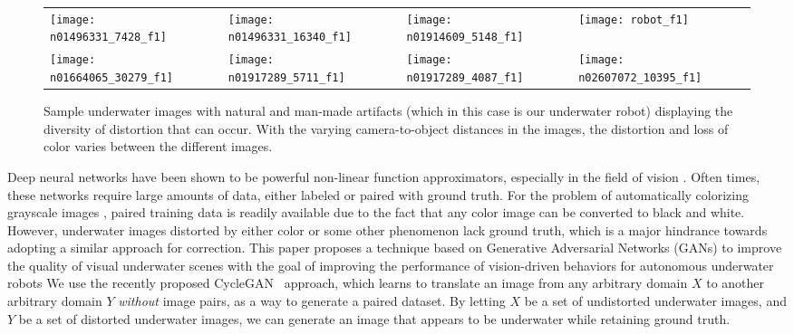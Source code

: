 \begin{figure}
\centering
\begin{tabular}{p{1.7cm} p{1.7cm} p{1.7cm} p{1.7cm}}
   
   \texttt{[image: n01496331\_7428\_f1]} &
   \texttt{[image: n01496331\_16340\_f1]} &
   \texttt{[image: n01914609\_5148\_f1]} &
   \texttt{[image: robot\_f1]} \\
   \texttt{[image: n01664065\_30279\_f1]} &
   \texttt{[image: n01917289\_5711\_f1]} &
   \texttt{[image: n01917289\_4087\_f1]} &
   \texttt{[image: n02607072\_10395\_f1]} \\

\end{tabular}
\label{fig:samples}
\caption{Sample underwater images with natural and man-made artifacts (which in this case is our underwater robot) displaying the 
diversity of distortion that can occur. With the varying camera-to-object distances in the images, the distortion and loss of 
color varies between the different images.}
\end{figure}

Deep neural networks have been shown to be powerful non-linear function approximators, especially in the field of vision 
\cite{krizhevsky2012imagenet}. Often times, these networks require large amounts of data, either labeled or paired with
ground truth. For the problem of automatically colorizing grayscale images \cite{zhang2016colorful}, paired training
data is
readily available due to the fact that any color image can be converted to black and white. However, underwater images distorted 
by either
color or some other phenomenon lack ground truth, which is a major hindrance towards adopting a similar approach for correction. 
This paper proposes a technique based on Generative Adversarial Networks (GANs) to improve the quality of visual underwater scenes 
with the goal of improving the performance of vision-driven behaviors for autonomous underwater robots
We use the recently proposed CycleGAN~\cite{zhu2017unpaired} approach, which learns to translate an image from any arbitrary 
domain $X$ to another arbitrary domain $Y$ \textit{without} image pairs, as a way to generate a paired dataset.
By letting $X$ be a set of undistorted underwater images, and
$Y$ be a set of distorted underwater images, we can generate an image that appears to be underwater while retaining
ground truth.